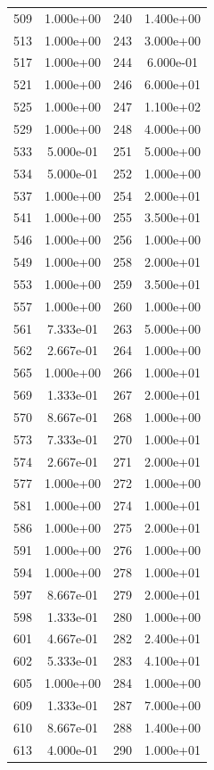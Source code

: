 \documentclass[12pt]{article}
\begin{document}
\begin{longtable}{@{}cccc@{}}
509 & 1.000e+00 & 240 & 1.400e+00 \\
513 & 1.000e+00 & 243 & 3.000e+00 \\
517 & 1.000e+00 & 244 & 6.000e-01 \\
521 & 1.000e+00 & 246 & 6.000e+01 \\
525 & 1.000e+00 & 247 & 1.100e+02 \\
529 & 1.000e+00 & 248 & 4.000e+00 \\
533 & 5.000e-01 & 251 & 5.000e+00 \\
534 & 5.000e-01 & 252 & 1.000e+00 \\
537 & 1.000e+00 & 254 & 2.000e+01 \\
541 & 1.000e+00 & 255 & 3.500e+01 \\
546 & 1.000e+00 & 256 & 1.000e+00 \\
549 & 1.000e+00 & 258 & 2.000e+01 \\
553 & 1.000e+00 & 259 & 3.500e+01 \\
557 & 1.000e+00 & 260 & 1.000e+00 \\
561 & 7.333e-01 & 263 & 5.000e+00 \\
562 & 2.667e-01 & 264 & 1.000e+00 \\
565 & 1.000e+00 & 266 & 1.000e+01 \\
569 & 1.333e-01 & 267 & 2.000e+01 \\
570 & 8.667e-01 & 268 & 1.000e+00 \\
573 & 7.333e-01 & 270 & 1.000e+01 \\
574 & 2.667e-01 & 271 & 2.000e+01 \\
577 & 1.000e+00 & 272 & 1.000e+00 \\
581 & 1.000e+00 & 274 & 1.000e+01 \\
586 & 1.000e+00 & 275 & 2.000e+01 \\
591 & 1.000e+00 & 276 & 1.000e+00 \\
594 & 1.000e+00 & 278 & 1.000e+01 \\
597 & 8.667e-01 & 279 & 2.000e+01 \\
598 & 1.333e-01 & 280 & 1.000e+00 \\
601 & 4.667e-01 & 282 & 2.400e+01 \\
602 & 5.333e-01 & 283 & 4.100e+01 \\
605 & 1.000e+00 & 284 & 1.000e+00 \\
609 & 1.333e-01 & 287 & 7.000e+00 \\
610 & 8.667e-01 & 288 & 1.400e+00 \\
613 & 4.000e-01 & 290 & 1.000e+01 \\

\end{longtable}
\end{document}

